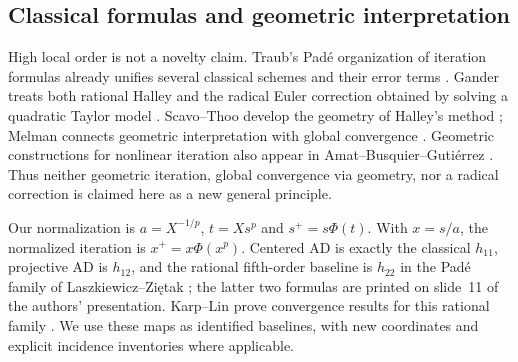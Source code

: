 \documentclass[11pt,a4paper]{article}
\begin{document}
\subsection{Classical formulas and geometric interpretation}
High local order is not a novelty claim. Traub's Pad\'e organization of iteration formulas already unifies several classical schemes and their error terms \cite{traub1961,traub1964}. Gander treats both rational Halley and the radical Euler correction obtained by solving a quadratic Taylor model \cite[pp.~131--133]{gander1985}. Scavo--Thoo develop the geometry of Halley's method \cite{scavo1995}; Melman connects geometric interpretation with global convergence \cite{melman1997}. Geometric constructions for nonlinear iteration also appear in Amat--Busquier--Guti\'errez \cite{amat2003}. Thus neither geometric iteration, global convergence via geometry, nor a radical correction is claimed here as a new general principle.

Our normalization is $a=X^{-1/p}$, $t=Xs^p$ and $s^+=s\Phi(t)$. With $x=s/a$, the normalized iteration is $x^+=x\Phi(x^p)$. Centered AD is exactly the classical $h_{11}$, projective AD is $h_{12}$, and the rational fifth-order baseline is $h_{22}$ in the Pad\'e family of Laszkiewicz--Zi\k{e}tak \cite{laszkiewicz2009,zietakSlides2009}; the latter two formulas are printed on slide~11 of the authors' presentation. Karp--Lin prove convergence results for this rational family \cite{karp2011}. We use these maps as identified baselines, with new coordinates and explicit incidence inventories where applicable.
\end{document}
